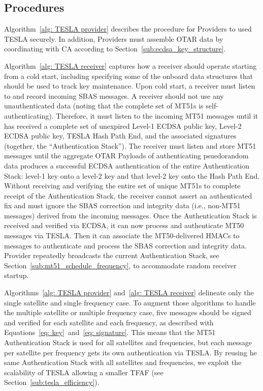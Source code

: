 \documentclass[APA,STIX1COL]{IONjournal/ION-APA Template}
\begin{document}
	\subsection{Procedures} \label{sub:procedures}

		Algorithm~\ref{alg: TESLA provider} describes the procedure for Providers to used TESLA securely.
		In addition, Providers must assemble OTAR data by coordinating with CA according to Section~\ref{sub:ecdsa_key_structure}.

		Algorithm~\ref{alg: TESLA receiver} captures how a receiver should operate starting from a cold start, including specifying some of the onboard data structures that should be used to track key maintenance.
		Upon cold start, a receiver must listen to and record incoming SBAS messages.
		A receiver should not use any unauthenticated data (noting that the complete set of MT51s is self-authenticating).
		Therefore, it must listen to the incoming MT51 messages until it has received a complete set of unexpired Level-1 ECDSA public key, Level-2 ECDSA public key, TESLA Hash Path End, and the associated signatures (together, the ``Authentication Stack'').
		The receiver must listen and store MT51 messages until the aggregate OTAR Payloads of  authenticating psuedorandom data produces a successful ECDSA authentication of the entire Authentication Stack: level-1 key onto a level-2 key and that level-2 key onto the Hash Path End.
		Without receiving and verifying the entire set of unique MT51s to complete receipt of the Authentication Stack, the receiver cannot assert an authenticated fix and must ignore the SBAS correction and integrity data (i.e., non-MT51 messages) derived from the incoming messages.
		Once the Authentication Stack is received and verified via ECDSA, it can now process and authenticate MT50 messages via TESLA.
		Then it can associate the MT50-delivered HMACs to messages to authenticate and process the SBAS correction and integrity data.
		Provider repeatedly broadcasts the current Authentication Stack, see Section~\ref{sub:mt51_schedule_frequency}, to accommodate random receiver startup.

		Algorithms~\ref{alg: TESLA provider} and~\ref{alg: TESLA receiver} delineate only the single satellite and single frequency case.
		To augment those algorithms to handle the multiple satellite or multiple frequency case, five messages should be signed and verified for each satellite and each frequency, as described with Equations~\eqref{eq: key}~and~\eqref{eq: signature}.
		This means that the MT51 Authentication Stack is used for all satellites and frequencies, but each message per satellite per frequency gets its own authentication via TESLA.
		By reusing he same Authentication Stack with all satellites and frequencies, we exploit the scalability of TESLA allowing a smaller TFAF (see Section~\ref{sub:tesla_efficiency}).
\end{document}

